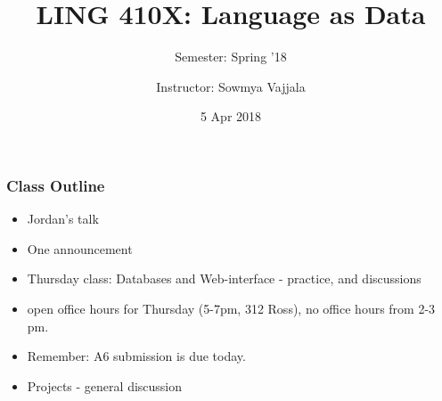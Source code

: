 \documentclass{beamer}
\author[Sowmya Vajjala]{Instructor: Sowmya Vajjala}
\title[LING 410X]{LING 410X: Language as Data}
\subtitle{Semester: Spring '18}
\date{5 Apr 2018}
\institute{Iowa State University, USA}
\begin{document}
\begin{frame}\titlepage
\end{frame}

\begin{frame}
\frametitle{Class Outline}
\begin{itemize}
\item Jordan's talk
\item One announcement
\item Thursday class: Databases and Web-interface - practice, and discussions
\item open office hours for Thursday (5-7pm, 312 Ross), no office hours from 2-3 pm.
\item Remember: A6 submission is due today.
\item Projects - general discussion
\end{itemize}
\end{frame}
\end{document}

